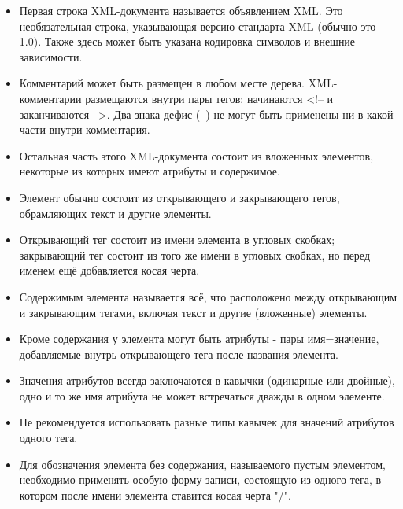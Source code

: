 \documentclass[12pt,a4paper,oneside]{article} %
\begin{document}
\begin{itemize}
\item Первая строка XML-документа называется объявлением XML. \linebreak
Это необязательная строка, указывающая версию стандарта XML \linebreak
(обычно это 1.0). Также здесь может быть указана кодировка \linebreak
символов и внешние зависимости.
\item	Комментарий может быть размещен в любом месте дерева. \linebreak
XML-комментарии размещаются внутри пары тегов: начинаются \linebreak
<!-- и заканчиваются -->. Два знака дефис (--) не могут быть применены\linebreak
 ни в какой части внутри комментария.
\item	Остальная часть этого XML-документа состоит из вложенных \linebreak
элементов, некоторые из которых имеют атрибуты и содержимое.
\item	Элемент обычно состоит из открывающего и закрывающего \linebreak
тегов, обрамляющих текст и другие элементы.
\item	Открывающий тег состоит из имени элемента в угловых \linebreak
скобках; закрывающий тег состоит из того же имени в угловых \linebreak
скобках, но перед именем ещё добавляется косая черта.
\item Содержимым элемента называется всё, что расположено \linebreak
между открывающим и закрывающим тегами, включая текст и \linebreak
другие (вложенные) элементы.
\item	Кроме содержания у элемента могут быть атрибуты - пары\linebreak
имя=значение, добавляемые внутрь открывающего тега после \linebreak
названия элемента.
\item	Значения атрибутов всегда заключаются в кавычки (одинарные или\linebreak
 двойные), одно и то же имя атрибута не может встречаться дважды\linebreak
  в одном элементе.
\item	Не рекомендуется использовать разные типы кавычек для значений\linebreak
 атрибутов одного тега.
\item	Для обозначения элемента без содержания, называемого пустым \linebreak
элементом, необходимо применять особую форму записи, состоящую из \linebreak
одного тега, в котором после имени элемента ставится косая черта "/".
\end{itemize}
\end{document}
